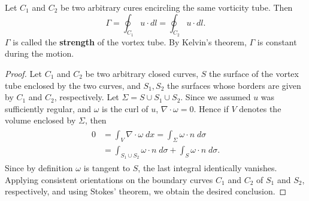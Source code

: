 \documentclass{article}
\begin{document}
\begin{theorem}[Helmholtz]
	Let $C_{1}$ and $C_{2}$ be two arbitrary cures encircling the same vorticity tube. Then 
	\begin{equation}
		\Gamma = \oint_{C_{1}}u\cdot dl = \oint_{C_{2}}u\cdot dl. 
	\end{equation} 
	$\Gamma$ is called the \textbf{strength} of the vortex tube. By Kelvin's theorem, $\Gamma$ is constant during the motion. 
\end{theorem} 
\begin{proof}
	Let $C_{1}$ and $C_{2}$ be two arbitrary closed curves, $S$ the surface of the vortex tube enclosed by the two curves, and $S_{1}, S_{2}$ the surfaces whose borders are given by $C_{1}$ and $C_{2}$, respectively. Let $\Sigma = S \cup S_{1} \cup S_{2}$. Since we assumed $u$ was sufficiently regular, and $\omega$ is the curl of $u$, $\nabla \cdot \omega = 0$. Hence if $V$ denotes the volume enclosed by $\Sigma$, then 
	\begin{align*}
		\begin{split}
			0 &= \int_{V}\nabla \cdot \omega\;dx = \int_{\Sigma} \omega \cdot n\;d\sigma \\
			&= \int_{S_{1} \cup S_{2}}\omega \cdot n\;d\sigma + \int_{S}\omega \cdot n\;d\sigma. 
		\end{split} 
	\end{align*} 
	Since by definition $\omega$ is tangent to $S$, the last integral identically vanishes. Applying consistent orientations on the boundary curves $C_{1}$ and $C_{2}$ of $S_{1}$ and $S_{2}$, respectively, and using Stokes' theorem, we obtain the desired conclusion. 
\end{proof} 
\end{document}
